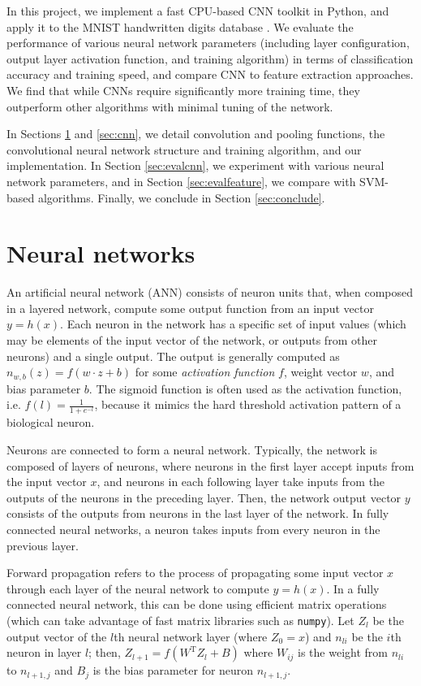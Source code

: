 \documentclass[10pt,twocolumn]{article}
\begin{document}
In this project, we implement a fast CPU-based CNN toolkit \cite{git:cnn} in Python, and apply it to the MNIST handwritten digits database \cite{mnist}. We evaluate the performance of various neural network parameters (including layer configuration, output layer activation function, and training algorithm) in terms of classification accuracy and training speed, and compare CNN to feature extraction approaches. We find that while CNNs require significantly more training time, they outperform other algorithms with minimal tuning of the network.

In Sections \ref{sec:neural} and \ref{sec:cnn}, we detail convolution and pooling functions, the convolutional neural network structure and training algorithm, and our implementation. In Section \ref{sec:evalcnn}, we experiment with various neural network parameters, and in Section \ref{sec:evalfeature}, we compare with SVM-based algorithms. Finally, we conclude in Section \ref{sec:conclude}.

\section{Neural networks} \label{sec:neural}

An artificial neural network (ANN) consists of neuron units that, when composed in a layered network, compute some output function from an input vector $y = h(x)$. Each neuron in the network has a specific set of input values (which may be elements of the input vector of the network, or outputs from other neurons) and a single output. The output is generally computed as $n_{w, b}(z) = f(w \cdot z + b)$ for some \emph{activation function} $f$, weight vector $w$, and bias parameter $b$. The sigmoid function is often used as the activation function, i.e. $f(l) = \frac{1}{1+e^{-l}}$, because it mimics the hard threshold activation pattern of a biological neuron.

Neurons are connected to form a neural network. Typically, the network is composed of layers of neurons, where neurons in the first layer accept inputs from the input vector $x$, and neurons in each following layer take inputs from the outputs of the neurons in the preceding layer. Then, the network output vector $y$ consists of the outputs from neurons in the last layer of the network. In fully connected neural networks, a neuron takes inputs from every neuron in the previous layer.

Forward propagation refers to the process of propagating some input vector $x$ through each layer of the neural network to compute $y = h(x)$. In a fully connected neural network, this can be done using efficient matrix operations (which can take advantage of fast matrix libraries such as \texttt{numpy}). Let $Z_l$ be the output vector of the $l$th neural network layer (where $Z_0 = x$) and $n_{li}$ be the $i$th neuron in layer $l$; then, $Z_{l+1} = f(W^{\text{T}} Z_l + B)$ where $W_{ij}$ is the weight from $n_{li}$ to $n_{l+1,j}$ and $B_j$ is the bias parameter for neuron $n_{l+1,j}$.
\end{document}
